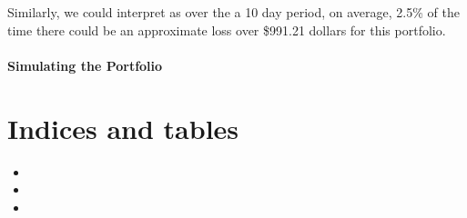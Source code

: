\documentclass[letterpaper,10pt,english]{sphinxmanual}
\begin{document}
Similarly, we could interpret as over the a 10 day period, on average,
2.5\% of the time there could be an approximate loss over \$991.21 dollars
for this portfolio.


\subsubsection{Simulating the Portfolio}
\label{\detokenize{gettingstarted:simulating-the-portfolio}}

\chapter{Indices and tables}
\label{\detokenize{index:indices-and-tables}}\begin{itemize}
\item {} 

\item {} 

\item {} 

\end{itemize}



\renewcommand{\indexname}{Index}
\printindex
\end{document}
